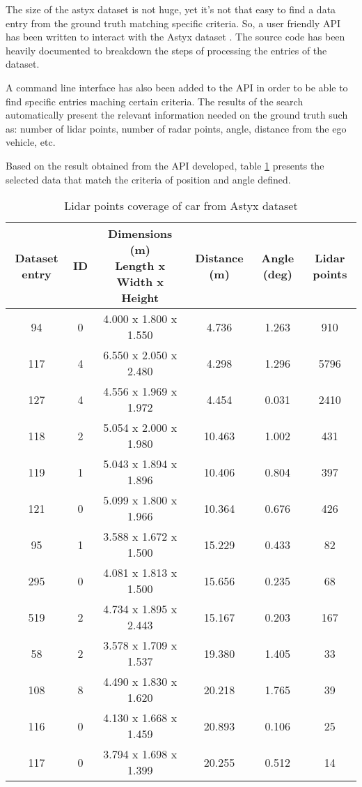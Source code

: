 \documentclass{scrartcl}
\begin{document}
  The size of the astyx dataset is not huge, yet it's not that easy to find
  a data entry from the ground truth matching specific criteria. So, a user
  friendly API has been written to interact with the Astyx dataset
  \cite{astyx-library}.
  The source code has been heavily documented to breakdown the steps of
  processing the entries of the dataset.

  A command line interface has also been added to the API in order to be able
  to find specific entries maching certain criteria. The results of the search
  automatically present the relevant information needed on the ground truth
  such as: number of lidar points, number of radar points, angle, distance from
  the ego vehicle, etc.

  Based on the result obtained from the API developed, table
  \ref{table:astyx-lidar-data} presents the selected data that match the
  criteria of position and angle defined.

  \begin{table}[!htbp]
    \centering
    \caption{Lidar points coverage of car from Astyx dataset}
    \begin{tabular}{ | c | c | c | c | c | c |}
      \hline
      \textbf{Dataset entry} & \textbf{ID} & 
      \makecell{\textbf{Dimensions (m)} \\ Length x Width x Height} &
      \textbf{Distance (m)} & \textbf{Angle (deg)} & \textbf{Lidar points} \\
      \hline \hline
      94 & 0 & 4.000 x 1.800 x 1.550 & 4.736 & 1.263 & 910 \\
      117 & 4 & 6.550 x 2.050 x 2.480 & 4.298 & 1.296 & 5796 \\
      127 & 4 & 4.556 x 1.969 x 1.972 & 4.454 & 0.031 & 2410 \\
      \hline
      \hline
      118 & 2 & 5.054 x 2.000 x 1.980 & 10.463 & 1.002 & 431 \\
      119 & 1 & 5.043 x 1.894 x 1.896 & 10.406 & 0.804 & 397 \\
      121 & 0 & 5.099 x 1.800 x 1.966 & 10.364 & 0.676 & 426 \\
      \hline
      \hline
      95 & 1 & 3.588 x 1.672 x 1.500 & 15.229 & 0.433 & 82 \\
      295 & 0 & 4.081 x 1.813 x 1.500 & 15.656 & 0.235 & 68 \\
      519 & 2 & 4.734 x 1.895 x 2.443 & 15.167 & 0.203 & 167 \\
      \hline
      \hline
      58 & 2 & 3.578 x 1.709 x 1.537 & 19.380 & 1.405 & 33 \\
      108 & 8 & 4.490 x 1.830 x 1.620 & 20.218 & 1.765 & 39 \\
      116 & 0 & 4.130 x 1.668 x 1.459 & 20.893 & 0.106 & 25 \\
      117 & 0 & 3.794 x 1.698 x 1.399 & 20.255 & 0.512 & 14 \\
      \hline
    \end{tabular}
    \label{table:astyx-lidar-data}
  \end{table}
\end{document}
